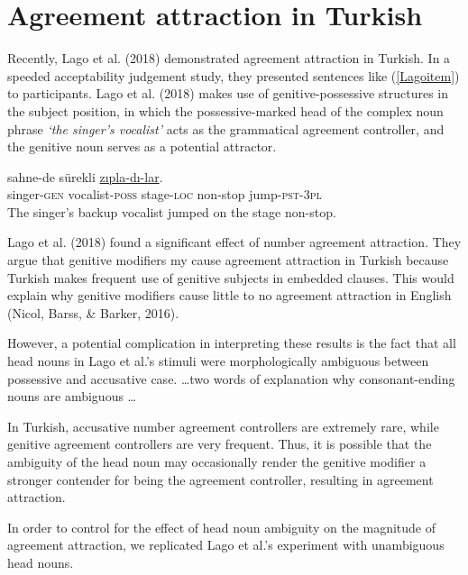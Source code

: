 \documentclass[doc]{apa6}
\begin{document}
\hypertarget{agreement-attraction-in-turkish}{%
\section{Agreement attraction in Turkish}\label{agreement-attraction-in-turkish}}

Recently, Lago et al. (2018) demonstrated agreement attraction in Turkish. In a speeded acceptability judgement study, they presented sentences like (\ref{Lagoitem}) to participants.
Lago et al. (2018) makes use of genitive-possessive structures in the subject position, in which the possessive-marked head of the complex noun phrase \emph{`the singer's vocalist'} acts as the grammatical agreement controller, and the genitive noun serves as a potential attractor.

\begin{exe}
\ex \label{Lagoitem}
 sahne-de sürekli \underline{zıpla-dı-lar}.\\
singer-\textsc{gen} vocalist-\textsc{poss} stage-\textsc{loc} non-stop jump-\textsc{pst}-\textsc{3pl}\\
\glt The singer's backup vocalist jumped on the stage non-stop.
\end{exe}

Lago et al. (2018) found a significant effect of number agreement attraction.
They argue that genitive modifiers my cause agreement attraction in Turkish because Turkish makes frequent use of genitive subjects in embedded clauses. This would explain why genitive modifiers cause little to no agreement attraction in English
(Nicol, Barss, \& Barker, 2016).

However, a potential complication in interpreting these results is the fact that all head nouns in Lago et al.'s stimuli were morphologically ambiguous between possessive and accusative case.
\ldots two words of explanation why consonant-ending nouns are ambiguous \ldots

In Turkish, accusative number agreement controllers are extremely rare, while genitive agreement controllers are very frequent. Thus, it is possible that the ambiguity of the head noun may occasionally render the genitive modifier a stronger contender for being the agreement controller, resulting in agreement attraction.

In order to control for the effect of head noun ambiguity on the magnitude of agreement attraction, we replicated Lago et al.'s experiment with unambiguous head nouns.
\end{document}
